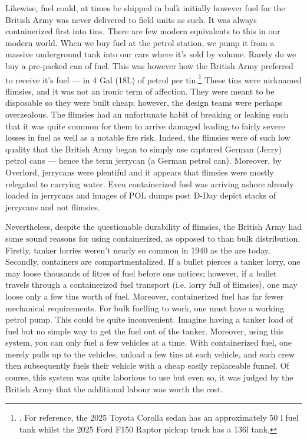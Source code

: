 \documentclass[noraggedright]{turabian-researchpaper}
\newcommand{\Petrol}{Precis of Lecture No. 12:  Petrol}
\begin{document}
Likewise, fuel could, at times be shipped in bulk initially however fuel for
the British Army was never delivered to field units as such.  It was always
containerized first into tins.  There are few modern equivalents to this in
our modern world.  When we buy fuel at the petrol station, we pump it from a 
massive underground tank into our cars where it's sold by volume.  Rarely do
we buy a pre-packed can of fuel.  This was however how the British Army 
preferred to receive it's fuel --- in 4 Gal (18L) of petrol per tin.\footnote
{\cite[\Petrol][3]{27course}.
For reference, the 2025 Toyota Corolla sedan has an approximately 50 l fuel 
tank whilst the 2025 Ford F150 Raptor pickup truck has a 136l tank.}%
These tins were nicknamed flimsies, and it was not an ironic term of affection. 
They were meant to be disposable so they were built cheap; however, the 
design teams were perhaps overzealous.  The flimsies had an unfortunate habit
of breaking or leaking such that it was quite common for them to arrive 
damaged leading to fairly severe losses in fuel as well as a notable fire risk.  
Indeed, the flimsies were of such low quality that the British Army began to 
simply use captured German (Jerry) petrol cans --- hence the term 
jerrycan (a German petrol can).  Moreover, by Overlord, jerrycans were 
plentiful and it appears that flimsies were mostly relegated to carrying 
water.  Even containerized fuel was arriving ashore already loaded in
jerrycans and images of POL dumps post D-Day depict stacks of jerrycans and
not flimsies.\autocite[8:30 -- 10:55]{buildup}


Nevertheless, despite the questionable durability of flimsies, the British 
Army had some sound reasons for using containerized, as opposed to than bulk 
distribution.  Firstly, tanker lorries weren't nearly so common in 1940 as the 
are today.%
Secondly,
containers are compartmentalized.  If a bullet pierces a tanker lorry, one may
loose thousands of litres of fuel before one notices; however, if a bullet 
travels through a containerized fuel transport (i.e. lorry full of flimsies),
one may loose only a few tins worth of fuel.%
Moreover, containerized fuel has
far fewer mechanical requirements.  For bulk fuelling to work, one must have a 
working petrol pump.  This could be quite inconvenient.  Imagine having a 
tanker load of fuel but no simple way to get the fuel out of the tanker.  
Moreover, using this system, you can only fuel a few vehicles at a time.  
With containerized fuel, one merely pulls up to the vehicles, unload a few
tins at each vehicle, and each crew then subsequently fuels their vehicle
with a cheap easily replaceable funnel.  Of course, this system was quite 
laborious to use but even so, it was judged by the British Army that the 
additional labour was worth the cost.  %
\end{document}

